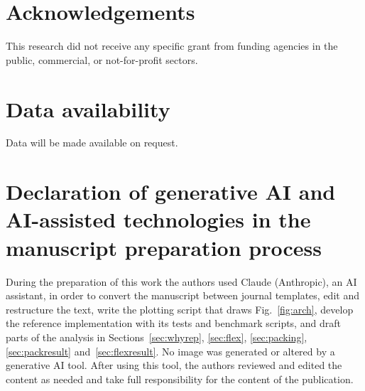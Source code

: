 \documentclass[a4paper,fleqn]{cas-sc}
\begin{document}
\section*{Acknowledgements}
This research did not receive any specific grant from funding agencies in the
public, commercial, or not-for-profit sectors.

\section*{Data availability}
Data will be made available on request.

\section*{Declaration of generative AI and AI-assisted technologies in the
manuscript preparation process}
During the preparation of this work the authors used Claude (Anthropic), an
AI assistant, in order to convert the manuscript between journal templates,
edit and restructure the text, write the plotting script that draws
Fig.~\ref{fig:arch}, develop the reference implementation with its tests
and benchmark scripts, and draft parts of the analysis in
Sections~\ref{sec:whyrep}, \ref{sec:flex}, \ref{sec:packing},
\ref{sec:packresult} and~\ref{sec:flexresult}. No image was generated or
altered by a generative AI tool. After using this tool, the authors reviewed
and edited the content as needed and take full responsibility for the content
of the publication.



\end{document}

